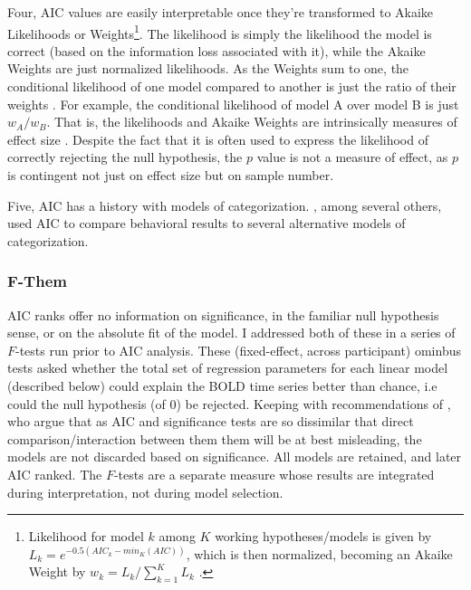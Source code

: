 \documentclass[doc,12pt]{apa}        %
\begin{document}
Four, AIC values are easily interpretable once they're transformed to Akaike Likelihoods or Weights\footnote{
    Likelihood for model $k$ among $K$ working hypotheses/models is given by $L_k = e^{-0.5({AIC}_k - {min}_{K}{(AIC)})}$, which is then normalized, becoming an Akaike Weight by $w_k = L_k / \sum\limits_{k=1}^K L_k$ \cite{Burnham:2004p9621}.}.  The likelihood is simply the likelihood the model is correct (based on the information loss associated with it), while the Akaike Weights are just normalized likelihoods.  As the Weights sum to one, the conditional likelihood of one model compared to another is just the ratio of their weights \cite{Burnham:2004p9621}.  For example, the conditional likelihood of model A over model B is just $w_A/w_B$.  That is, the likelihoods and Akaike Weights are intrinsically measures of effect size \cite{Anderson:2000p9475,Forster:2000p9623}.  Despite the fact that it is often used to express the likelihood of correctly rejecting the null hypothesis, the $p$ value is not a measure of effect, as $p$ is contingent not just on effect size but on sample number.  
    
    Five, AIC has a history with models of categorization. , among several others, used AIC to compare behavioral results to several alternative models of categorization.  

\subsubsection{F-Them}
\label{subsub:F}
AIC ranks offer no information on significance, in the familiar null hypothesis sense, or on the absolute fit of the model.  I addressed both of these in a series of $F$-tests run prior to AIC analysis.  These (fixed-effect, across participant) ominbus tests asked whether the total set of regression parameters for each linear model (described below) could explain the BOLD time series better than chance, i.e could the null hypothesis (of 0) be rejected.  Keeping with recommendations of , who argue that as AIC and significance tests are so dissimilar that direct comparison/interaction between them them will be at best misleading, the models are not discarded based on significance.  All models are retained, and later AIC ranked.  The $F$-tests are a separate measure whose results are integrated during interpretation, not during model selection.
\end{document}
